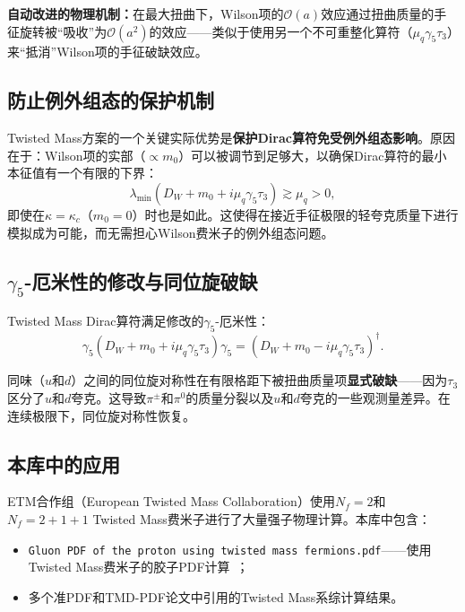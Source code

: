 \documentclass[12pt,a4paper]{ctexart}
\theoremstyle{definition}
\begin{document}
\textbf{自动改进的物理机制：}在最大扭曲下，Wilson项的$\mathcal{O}(a)$效应通过扭曲质量的手征旋转被``吸收''为$\mathcal{O}(a^2)$的效应——类似于使用另一个不可重整化算符（$\mu_q\gamma_5\tau_3$）来``抵消''Wilson项的手征破缺效应。

\subsection{防止例外组态的保护机制}

Twisted Mass方案的一个关键实际优势是\textbf{保护Dirac算符免受例外组态影响}。原因在于：Wilson项的实部（$\propto m_0$）可以被调节到足够大，以确保Dirac算符的最小本征值有一个有限的下界：
\begin{equation}
\lambda_{\min}(D_W + m_0 + i\mu_q\gamma_5\tau_3) \gtrsim \mu_q > 0,
\label{eq:tm_protection}
\end{equation}
即使在$\kappa = \kappa_c$（$m_0 = 0$）时也是如此。这使得在接近手征极限的轻夸克质量下进行模拟成为可能，而无需担心Wilson费米子的例外组态问题。

\subsection{$\gamma_5$-厄米性的修改与同位旋破缺}

Twisted Mass Dirac算符满足修改的$\gamma_5$-厄米性：
\begin{equation}
\gamma_5 (D_W + m_0 + i\mu_q\gamma_5\tau_3) \gamma_5 = (D_W + m_0 - i\mu_q\gamma_5\tau_3)^\dagger.
\label{eq:tm_gamma5}
\end{equation}

同味（$u$和$d$）之间的同位旋对称性在有限格距下被扭曲质量项\textbf{显式破缺}——因为$\tau_3$区分了$u$和$d$夸克。这导致$\pi^\pm$和$\pi^0$的质量分裂以及$u$和$d$夸克的一些观测量差异。在连续极限下，同位旋对称性恢复。

\subsection{本库中的应用}

ETM合作组（European Twisted Mass Collaboration）使用$N_f=2$和$N_f=2+1+1$ Twisted Mass费米子进行了大量强子物理计算。本库中包含：
\begin{itemize}
    \item \texttt{Gluon PDF of the proton using twisted mass fermions.pdf}——使用Twisted Mass费米子的胶子PDF计算~\cite{ETMCgluonPDF}；
    \item 多个准PDF和TMD-PDF论文中引用的Twisted Mass系综计算结果。
\end{itemize}
\end{document}
